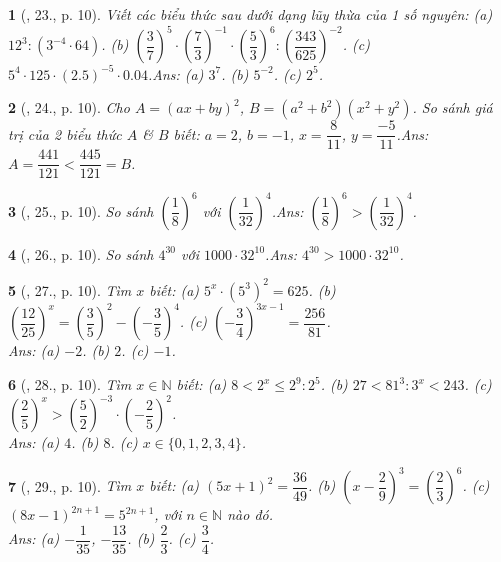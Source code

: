 \documentclass{article}
\newtheorem{baitoan}{}
\begin{document}
\begin{baitoan}[\cite{Tuyen_Toan_7}, 23., p. 10]
	Viết các biểu thức sau dưới dạng lũy thừa của 1 số nguyên: (a) $12^3:(3^{-4}\cdot 64)$. (b) $\left(\dfrac{3}{7}\right)^5\cdot\left(\dfrac{7}{3}\right)^{-1}\cdot\left(\dfrac{5}{3}\right)^6:\left(\dfrac{343}{625}\right)^{-2}$. (c) $5^4\cdot 125\cdot(2.5)^{-5}\cdot 0.04$.\hfill{\sf Ans: (a) $3^7$. (b) $5^{-2}$. (c) $2^5$.}
\end{baitoan}

\begin{baitoan}[\cite{Tuyen_Toan_7}, 24., p. 10]
	Cho $A = (ax + by)^2$, $B = (a^2 + b^2)(x^2 + y^2)$. So sánh giá trị của 2 biểu thức $A$ \& $B$ biết: $a = 2$, $b = -1$, $x = \dfrac{8}{11}$, $y = \dfrac{-5}{11}$.\hfill{\sf Ans: $A = \dfrac{441}{121} < \dfrac{445}{121} = B$.}
\end{baitoan}

\begin{baitoan}[\cite{Tuyen_Toan_7}, 25., p. 10]
	So sánh $\left(\dfrac{1}{8}\right)^6$ với $\left(\dfrac{1}{32}\right)^4$.\hfill{\sf Ans: $\left(\dfrac{1}{8}\right)^6 > \left(\dfrac{1}{32}\right)^4$.}
\end{baitoan}

\begin{baitoan}[\cite{Tuyen_Toan_7}, 26., p. 10]
	So sánh $4^{30}$ với $1000\cdot 32^{10}$.\hfill{\sf Ans: $4^{30} > 1000\cdot 32^{10}$.}
\end{baitoan}

\begin{baitoan}[\cite{Tuyen_Toan_7}, 27., p. 10]
	Tìm $x$ biết: (a) $5^x\cdot(5^3)^2 = 625$. (b) $\left(\dfrac{12}{25}\right)^x = \left(\dfrac{3}{5}\right)^2 - \left(-\dfrac{3}{5}\right)^4$. (c) $\left(-\dfrac{3}{4}\right)^{3x - 1} = \dfrac{256}{81}$.\\\mbox{}\hfill{\sf Ans: (a) $-2$. (b) $2$. (c) $-1$.}
\end{baitoan}

\begin{baitoan}[\cite{Tuyen_Toan_7}, 28., p. 10]
	Tìm $x\in\mathbb{N}$ biết: (a) $8 < 2^x\le 2^9:2^5$. (b) $27 < 81^3:3^x < 243$. (c) $\left(\dfrac{2}{5}\right)^x > \left(\dfrac{5}{2}\right)^{-3}\cdot\left(-\dfrac{2}{5}\right)^2$.\\\mbox{}\hfill{\sf Ans: (a) $4$. (b) $8$. (c) $x\in\{0,1,2,3,4\}$.}
\end{baitoan}

\begin{baitoan}[\cite{Tuyen_Toan_7}, 29., p. 10]
	Tìm $x$ biết: (a) $(5x + 1)^2 = \dfrac{36}{49}$. (b) $\left(x - \dfrac{2}{9}\right)^3 = \left(\dfrac{2}{3}\right)^6$. (c) $(8x - 1)^{2n + 1} = 5^{2n + 1}$, với $n\in\mathbb{N}$ nào đó.\\\mbox{}\hfill{\sf Ans: (a) $-\dfrac{1}{35}$, $-\dfrac{13}{35}$. (b) $\dfrac{2}{3}$. (c) $\dfrac{3}{4}$.}
\end{baitoan}
\end{document}
